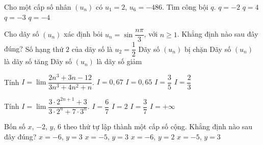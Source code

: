 \begin{ex}%
	Cho một cấp số nhân $\left(u_n\right)$ có $u_1=2$, $u_6=-486$. Tìm công bội $q$.
	\choice
	{ $q=-2$}
	{ $q=4$}
	{\True $q=-3$}
	{  $q=-4$}
\end{ex}
\begin{ex}%
	Cho dãy số
	$\left(u_n\right)$  xác định bỏi $u_n=\sin \dfrac{n\pi }{3}$, với $n \ge 1$. Khẳng định nào sau đây đúng?
	\choice
	{ Số hạng thứ $2$ của dãy số là $u_2=\dfrac{1}{2}$}
	{ \True Dãy số $\left(u_n\right)$ bị chặn } 
	{ Dãy số $\left(u_n\right)$ là dãy số tăng}
	{ Dãy số $\left(u_n\right)$  là dãy số giảm}
\end{ex}
\begin{ex}%
	 Tính $I = \lim \dfrac {2n^3 + 3n - 12} {3n^3 + 4n^2 + n}$.
	\choice
	{$I = 0{,}67$}
	{$I = 0{,}65$}
	{$I = \dfrac{3}{5}$}
	{\True $I = \dfrac{2}{3}$}
\end{ex}
\begin{ex}%
	Tính $I = \lim \dfrac {3\cdot 2^{2n + 1} + 3} {3\cdot 2^n + 7\cdot 3^n}.$ 
	\choice
	{$I = \dfrac{6}{7}$}
	{$I = 2$}
	{$I = \dfrac{3}{7}$}
	{\True $I =  + \infty $}
\end{ex}
\begin{ex}%
	Bốn số $x$, $-2$, $y$, $6$ theo thứ tự lập thành một cấp số cộng. Khẳng định nào sau đây đúng?	
	\choice
	{$x =  - 6$, $y = 3$}
	{$x =  - 5$, $y = 3$}
	{\True $x =  - 6$, $y = 2$}
	{$x =  - 5$, $y = 3$}
\end{ex}
